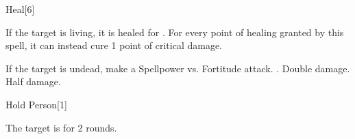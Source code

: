 \begin{spellsection}{Heal}[6]
    \begin{spellheader}
    \end{spellheader}
    \begin{spellcontent}
        \begin{spelltargetinginfo}
        \end{spelltargetinginfo}
        \begin{spelleffects}
            \spelleffect If the target is living, it is healed for \spelldamage{}.
            For every point of healing granted by this spell, it can instead cure 1 point of critical damage.
            \begin{spellattacktriggered}{If the target is undead, make a Spellpower vs. Fortitude attack.}
                \spellsuccess {}.
                \spellcritical Double damage.
                \spellfailure Half damage.
            \end{spellattacktriggered}
        \end{spelleffects}
    \end{spellcontent}
    \begin{spellfooter}
        \miscastrandom
    \end{spellfooter}
    \begin{spellaugments}
    \end{spellaugments}
\end{spellsection}

\begin{spellsection}{Hold Person}[1]
    \begin{spellheader}
    \end{spellheader}
    \begin{spellcontent}
        \begin{spelltargetinginfo}
        \end{spelltargetinginfo}
        \begin{spelleffects}
            \spelleffect The target is \immobilized for 2 rounds.
        \end{spelleffects}
    \end{spellcontent}
    \begin{spellfooter}
        \miscastrandom
    \end{spellfooter}
    \begin{spellaugments}
    \end{spellaugments}
\end{spellsection}

